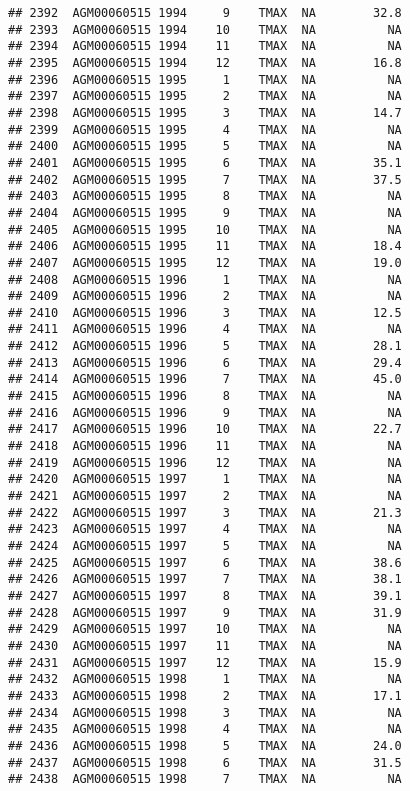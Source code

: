 \documentclass{article}\usepackage[]{graphicx}\usepackage[]{color}
\makeatletter
\newenvironment{kframe}{%
 \def\at@end@of@kframe{}%
 \ifinner\ifhmode%
  \def\at@end@of@kframe{\end{minipage}}%
  \begin{minipage}{\columnwidth}%
 \fi\fi%
 \def\FrameCommand##1{\hskip\@totalleftmargin \hskip-\fboxsep
 \colorbox{shadecolor}{##1}\hskip-\fboxsep
     \hskip-\linewidth \hskip-\@totalleftmargin \hskip\columnwidth}%
 \MakeFramed {\advance\hsize-\width
   \@totalleftmargin\z@ \linewidth\hsize
   \@setminipage}}%
 {\par\unskip\endMakeFramed%
 \at@end@of@kframe}
\newenvironment{knitrout}{}{} %
\makeatother
\begin{document}
\begin{knitrout}
\begin{kframe}
\begin{verbatim}
## 2392  AGM00060515 1994     9    TMAX  NA        32.8
## 2393  AGM00060515 1994    10    TMAX  NA          NA
## 2394  AGM00060515 1994    11    TMAX  NA          NA
## 2395  AGM00060515 1994    12    TMAX  NA        16.8
## 2396  AGM00060515 1995     1    TMAX  NA          NA
## 2397  AGM00060515 1995     2    TMAX  NA          NA
## 2398  AGM00060515 1995     3    TMAX  NA        14.7
## 2399  AGM00060515 1995     4    TMAX  NA          NA
## 2400  AGM00060515 1995     5    TMAX  NA          NA
## 2401  AGM00060515 1995     6    TMAX  NA        35.1
## 2402  AGM00060515 1995     7    TMAX  NA        37.5
## 2403  AGM00060515 1995     8    TMAX  NA          NA
## 2404  AGM00060515 1995     9    TMAX  NA          NA
## 2405  AGM00060515 1995    10    TMAX  NA          NA
## 2406  AGM00060515 1995    11    TMAX  NA        18.4
## 2407  AGM00060515 1995    12    TMAX  NA        19.0
## 2408  AGM00060515 1996     1    TMAX  NA          NA
## 2409  AGM00060515 1996     2    TMAX  NA          NA
## 2410  AGM00060515 1996     3    TMAX  NA        12.5
## 2411  AGM00060515 1996     4    TMAX  NA          NA
## 2412  AGM00060515 1996     5    TMAX  NA        28.1
## 2413  AGM00060515 1996     6    TMAX  NA        29.4
## 2414  AGM00060515 1996     7    TMAX  NA        45.0
## 2415  AGM00060515 1996     8    TMAX  NA          NA
## 2416  AGM00060515 1996     9    TMAX  NA          NA
## 2417  AGM00060515 1996    10    TMAX  NA        22.7
## 2418  AGM00060515 1996    11    TMAX  NA          NA
## 2419  AGM00060515 1996    12    TMAX  NA          NA
## 2420  AGM00060515 1997     1    TMAX  NA          NA
## 2421  AGM00060515 1997     2    TMAX  NA          NA
## 2422  AGM00060515 1997     3    TMAX  NA        21.3
## 2423  AGM00060515 1997     4    TMAX  NA          NA
## 2424  AGM00060515 1997     5    TMAX  NA          NA
## 2425  AGM00060515 1997     6    TMAX  NA        38.6
## 2426  AGM00060515 1997     7    TMAX  NA        38.1
## 2427  AGM00060515 1997     8    TMAX  NA        39.1
## 2428  AGM00060515 1997     9    TMAX  NA        31.9
## 2429  AGM00060515 1997    10    TMAX  NA          NA
## 2430  AGM00060515 1997    11    TMAX  NA          NA
## 2431  AGM00060515 1997    12    TMAX  NA        15.9
## 2432  AGM00060515 1998     1    TMAX  NA          NA
## 2433  AGM00060515 1998     2    TMAX  NA        17.1
## 2434  AGM00060515 1998     3    TMAX  NA          NA
## 2435  AGM00060515 1998     4    TMAX  NA          NA
## 2436  AGM00060515 1998     5    TMAX  NA        24.0
## 2437  AGM00060515 1998     6    TMAX  NA        31.5
## 2438  AGM00060515 1998     7    TMAX  NA          NA

\end{verbatim}
\end{kframe}
\end{knitrout}
\end{document}
